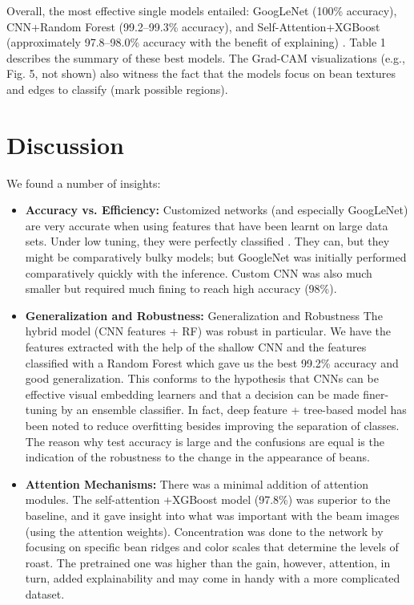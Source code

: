 \documentclass[conference]{IEEEtran}
\begin{document}
\begin{flushleft}
Overall, the most effective single models entailed: GoogLeNet (100\% accuracy), CNN+Random Forest (99.2--99.3\% accuracy), and Self-Attention+XGBoost (approximately 97.8--98.0\% accuracy with the benefit of explaining) \cite{OurResults2025}. Table 1 describes the summary of these best models. The Grad-CAM visualizations (e.g., Fig. 5, not shown) also witness the fact that the models focus on bean textures and edges to classify (mark possible regions).
\end{flushleft}


\section{Discussion}
We found a number of insights:

\begin{itemize}
    \item \textbf{Accuracy vs. Efficiency:} Customized networks (and especially GoogLeNet) are very accurate when using features that have been learnt on large data sets. Under low tuning, they were perfectly classified \cite{Hassan2024}. They can, but they might be comparatively bulky models; but GoogleNet was initially performed comparatively quickly with the inference. Custom CNN was also much smaller but required much fining to reach high accuracy (98\%).

    \item \textbf{Generalization and Robustness:} Generalization and Robustness The hybrid model (CNN features + RF) was robust in particular. We have the features extracted with the help of the shallow CNN and the features classified with a Random Forest which gave us the best 99.2\% accuracy and good generalization. This conforms to the hypothesis that CNNs can be effective visual embedding learners and that a decision can be made finer-tuning by an ensemble classifier. In fact, deep feature + tree-based model has been noted to reduce overfitting besides improving the separation of classes. The reason why test accuracy is large and the confusions are equal is the indication of the robustness to the change in the appearance of beans.

    \item \textbf{Attention Mechanisms:} There was a minimal addition of attention modules. The self-attention +XGBoost model (97.8\%) was superior to the baseline, and it gave insight into what was important with the beam images (using the attention weights). Concentration was done to the network by focusing on specific bean ridges and color scales that determine the levels of roast. The pretrained one was higher than the gain, however, attention, in turn, added explainability and may come in handy with a more complicated dataset.


\end{itemize}
\end{document}
